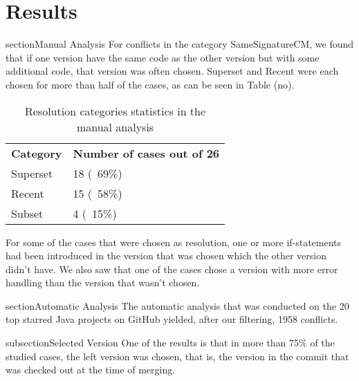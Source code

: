 \chapter{Results}
section{Manual Analysis}
For conflicts in the category SameSignatureCM, we found that if one version have the same code as the other version but with some additional code, that version was often chosen. Superset and Recent were each chosen for more than half of the cases, as can be seen in Table (no).

\begin{table}
\begin{tabular}{ p{8cm} p{6cm} }
\hline
\multicolumn{1}{c}{\textbf{Category}} & \multicolumn{1}{c}{\textbf{Number of cases out of 26}}\\
Superset & 18 (~69\%)\\
Recent & 15 (~58\%)\\
Subset & 4 (~15\%)\\
\end{tabular}
\caption{Resolution categories statistics in the manual analysis}\label{table:rcsitma}
\end{table}

For some of the cases that were chosen as resolution, one or more if-statements had been introduced in the version that was chosen which the other version didn’t have. We also saw that one of the cases chose a version with more error handling than the version that wasn’t chosen.

section{Automatic Analysis}
The automatic analysis that was conducted on the 20 top starred Java projects on GitHub yielded, after our filtering, 1958 conflicts.

subsection{Selected Version}
One of the results is that in more than 75\% of the studied cases, the left version was chosen, that is, the version in the commit that was checked out at the time of merging.


